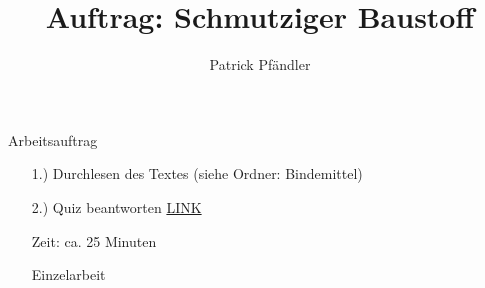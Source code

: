


\author{Patrick Pfändler}
\title{\textbf{Auftrag: Schmutziger Baustoff}}
\date{}




\frame{\titlepage}

\begin{frame}{Arbeitsauftrag}
    \begin{itemize}
        \item[1.)] Durchlesen des Textes (siehe Ordner: Bindemittel)
        \item[2.)] Quiz beantworten \href{https://www.classtime.com/code/FIVXGY}{LINK}
    \end{itemize}
    \vspace{\baselineskip}

\begin{itemize}
    \item [\textbullet] Zeit: ca. 25 Minuten
    \item [\textbullet] Einzelarbeit
\end{itemize}
\end{frame}


  